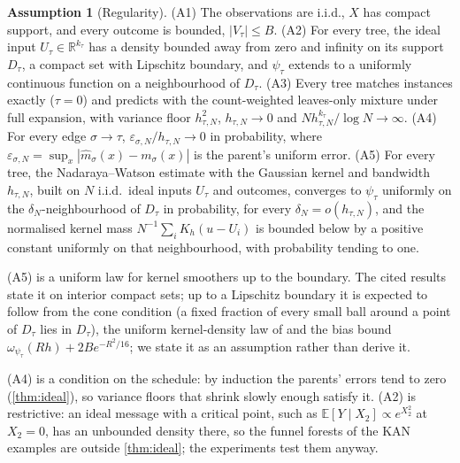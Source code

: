 \documentclass[11pt]{article}
\theoremstyle{definition}
\newtheorem{assumption}[theorem]{Assumption}
\theoremstyle{remark}
\newcommand{\R}{\mathbb{R}}
\newcommand{\E}{\mathbb{E}}
\begin{document}
\begin{assumption}[Regularity]\label{ass:regular}
(A1) The observations are i.i.d., $X$ has compact support, and every outcome is
bounded, $|V_\tau|\le B$.  (A2) For every tree, the ideal input
$U_\tau\in\R^{k_\tau}$ has a density bounded away from zero and infinity on its support
$D_\tau$, a compact set with Lipschitz boundary, and $\psi_\tau$ extends to a uniformly
continuous function on a neighbourhood of $D_\tau$.  (A3) Every tree matches instances exactly
($\tau=0$) and predicts with the count-weighted leaves-only mixture under full expansion,
with variance floor $h_{\tau,N}^2$, $h_{\tau,N}\to0$ and
$Nh_{\tau,N}^{k_\tau}/\log N\to\infty$.  (A4) For every edge $\sigma\to\tau$,
$\varepsilon_{\sigma,N}/h_{\tau,N}\to0$ in probability, where
$\varepsilon_{\sigma,N}=\sup_x|\hat m_\sigma(x)-m_\sigma(x)|$ is the parent's uniform
error.  (A5) For every tree, the Nadaraya--Watson estimate with the Gaussian kernel and
bandwidth $h_{\tau,N}$, built on $N$ i.i.d.\ ideal inputs $U_\tau$ and outcomes, converges to
$\psi_\tau$ uniformly on the $\delta_N$-neighbourhood of $D_\tau$ in probability, for every
$\delta_N=o(h_{\tau,N})$, and the normalised kernel mass $N^{-1}\sum_iK_h(u-U_i)$ is
bounded below by a positive constant uniformly on that neighbourhood, with probability
tending to one.
\end{assumption}

(A5) is a uniform law for kernel smoothers up to the boundary.  The cited results
\citep{devroye1978,mack1982} state it on interior compact sets; up to a Lipschitz boundary
it is expected to follow from the cone condition (a fixed fraction of every small ball
around a point of $D_\tau$ lies in $D_\tau$), the uniform kernel-density law of
\citet{einmahl2005} and the bias bound $\omega_{\psi_\tau}(Rh)+2Be^{-R^2/16}$; we state it as
an assumption rather than derive it.

(A4) is a condition on the schedule: by induction the parents' errors tend to zero
(\cref{thm:ideal}), so variance floors that shrink slowly enough satisfy it.  (A2) is
restrictive: an ideal message with a critical point, such as $\E[Y\mid X_2]\propto
e^{X_2^2}$ at $X_2=0$, has an unbounded density there, so the funnel forests of the KAN
examples are outside \cref{thm:ideal}; the experiments test them anyway.
\end{document}
